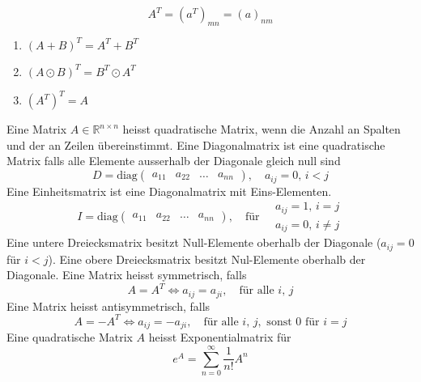 \begin{equation}
\boxed{A^T=\left(a^T\right)_{mn}=\left(a\right)_{nm}}
\end{equation}
\begin{enumerate}[$(i)$]
\item $\left(A+B\right)^T=A^T+B^T$
\item $\left(A\odot B\right)^T=B^T\odot A^T$
\item $\left(A^T\right)^T=A$
\end{enumerate}
Eine Matrix $A\in\mathbb{R}^{n\times n}$ heisst quadratische Matrix, wenn die Anzahl an Spalten und der an Zeilen übereinstimmt.
\newline\newline
Eine Diagonalmatrix ist eine quadratische Matrix falls alle Elemente ausserhalb der Diagonale gleich null sind
\begin{equation}
\boxed{D=\text{diag}\begin{pmatrix}a_{11}&a_{22}&\dotso&a_{nn}\end{pmatrix},\quad a_{ij}=0, \,i<j}
\end{equation}
Eine Einheitsmatrix ist eine Diagonalmatrix mit Eins-Elementen.
\begin{equation}
\boxed{I=\text{diag}\begin{pmatrix}a_{11}&a_{22}&\dotso&a_{nn}\end{pmatrix},\quad \text{für}\quad \begin{matrix}a_{ij}=1, \,i=j\\a_{ij}=0, \,i\neq j\end{matrix}}
\end{equation}
Eine untere Dreiecksmatrix besitzt Null-Elemente oberhalb der Diagonale ($a_{ij}=0$ für $i<j$). Eine obere Dreiecksmatrix besitzt Nul-Elemente oberhalb der Diagonale.
\newline\newline
Eine Matrix heisst symmetrisch, falls 
\begin{equation}
\boxed{A=A^T\Leftrightarrow a_{ij}=a_{ji},\quad \text{für alle }i,\,j}
\end{equation}
Eine Matrix heisst antisymmetrisch, falls
\begin{equation}
\boxed{A=-A^T\Leftrightarrow a_{ij}=-a_{ji},\quad \text{für alle }i,\,j,\text{ sonst }0\text{ für }i=j}
\end{equation}
Eine quadratische Matrix $A$ heisst Exponentialmatrix für
\begin{equation}
\boxed{e^A=\displaystyle \sum_{n=0}^{\infty}\dfrac{1}{n!}A^n}
\end{equation}
